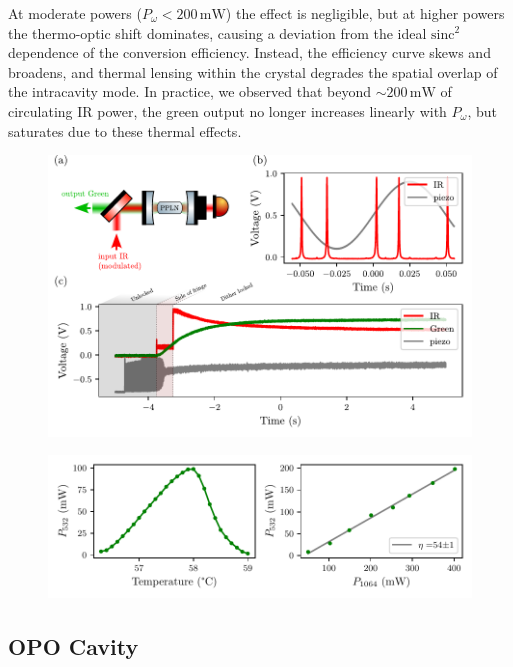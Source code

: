 At moderate powers ($P_\omega < 200\,\mathrm{mW}$) the effect is negligible, but at higher powers the thermo-optic shift dominates, causing a deviation from the ideal $\mathrm{sinc}^2$ dependence of the conversion efficiency. Instead, the efficiency curve skews and broadens, and thermal lensing within the crystal degrades the spatial overlap of the intracavity mode. In practice, we observed that beyond $\sim 200\,\mathrm{mW}$ of circulating IR power, the green output no longer increases linearly with $P_\omega$, but saturates due to these thermal effects.


\begin{figure}[h!]
    \centering  
    \includegraphics[width=\textwidth]{./chap6/fig/SHGlock_sweep.pdf}
    \caption{}
    \label{fig:shglock}
\end{figure}


\begin{figure}[h!]
    \centering  
    \includegraphics[width=\textwidth]{./chap6/fig/SHGscansTemp.pdf}
    \caption{}
    \label{fig:shgtemp}
\end{figure}



\subsection{OPO Cavity}

